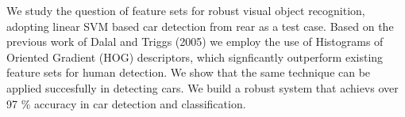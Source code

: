 We study the question of feature sets for robust visual object
recognition, adopting linear SVM based car detection from rear as a test case. Based on the previous work of Dalal and Triggs (2005) we employ the use of Histograms of Oriented Gradient (HOG) descriptors, which signficantly outperform existing feature sets for human detection. We show that the same technique can be applied succesfully in detecting cars. We build a robust system that achievs over 97 \% accuracy in car detection and classification.
